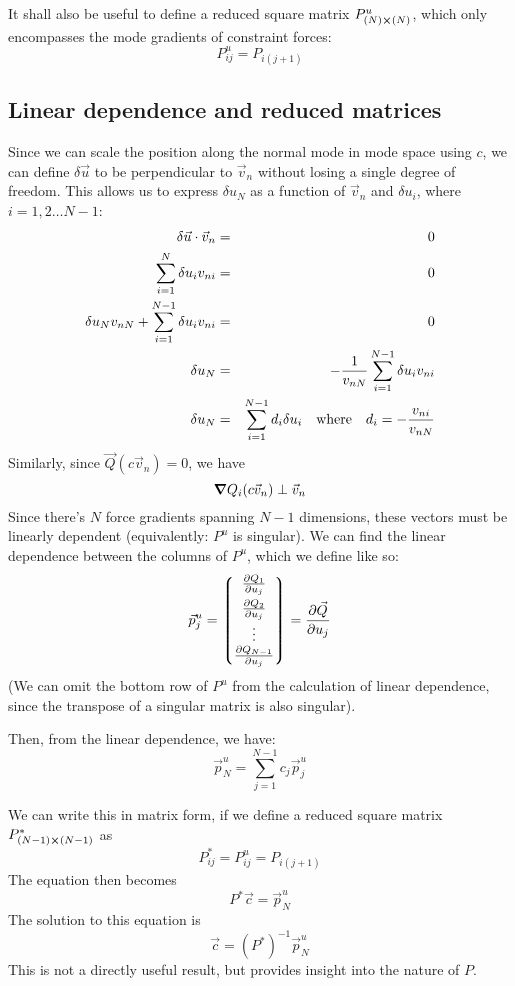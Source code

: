 \documentclass[12pt]{article}
\begin{document}
  It shall also be useful to define a reduced square matrix $P_{(N)\cross (N)}^u$, which only encompasses the mode gradients of constraint forces:
  $$P_{ij}^u = P_{i(j+1)}$$
  
  \subsection{Linear dependence and reduced matrices}
  Since we can scale the position along the normal mode in mode space using $c$, we can define $\delta\vec{u}$ to be perpendicular to $\vec{v}_n$ without losing a single degree of freedom. This allows us to express $\delta u_N$ as a function of $\vec{v}_n$ and $\delta u_i$, where $i=1, 2\dots N-1$:
  \begin{eqnarray*}
  \delta\vec{u}\cdot \vec{v}_n &=& 0\\
  \sum_{i=1}^N \delta u_i v_{ni} &=&0\\
  \delta u_N v_{nN} + \sum_{i=1}^{N-1} \delta u_i v_{ni} &=& 0\\
  \delta u_N &=& -\frac{1}{v_{nN}} \sum_{i=1}^{N-1} \delta u_i v_{ni}\\
  \delta u_N &=& \sum_{i=1}^{N-1} d_i \delta u_i\qq{where} d_i = -\frac{v_{ni}}{v_{nN}}
  \end{eqnarray*}
  Similarly, since $\vec{Q}(c\vec{v}_n)=0$, we have
  $$\grad Q_i(c\vec{v}_n) \perp \vec{v}_n$$
  Since there's $N$ force gradients spanning $N-1$ dimensions, these vectors must be linearly dependent (equivalently: $P^u$ is singular). We can find the linear dependence between the columns of $P^u$, which we define like so:
  $$\vec{p}_j^u = \mqty*( \pdv{Q_1}{u_j} \\[5pt] \pdv{Q_2}{u_j} \\ \vdots \\ \pdv{Q_{N-1}}{u_j}) = \pdv{\vec{Q}}{u_j}$$
  (We can omit the bottom row of $P^u$ from the calculation of linear dependence, since the transpose of a singular matrix is also singular).
  
  Then, from the linear dependence, we have:
  $$\vec{p}_N^u=\sum_{j=1}^{N-1} c_j \vec{p}_j^u$$
  
  We can write this in matrix form, if we define a reduced square matrix $P_{(N-1)\cross (N-1)}^*$ as
  $$P_{ij}^*=P_{ij}^u=P_{i(j+1)}$$
  The equation then becomes
  $$P^* \vec{c} = \vec{p}_N^u$$
  The solution to this equation is
  $$\vec{c} = (P^*)^{-1} \vec{p}_N^u$$
  This is not a directly useful result, but provides insight into the nature of $P$.
  
\end{document}
